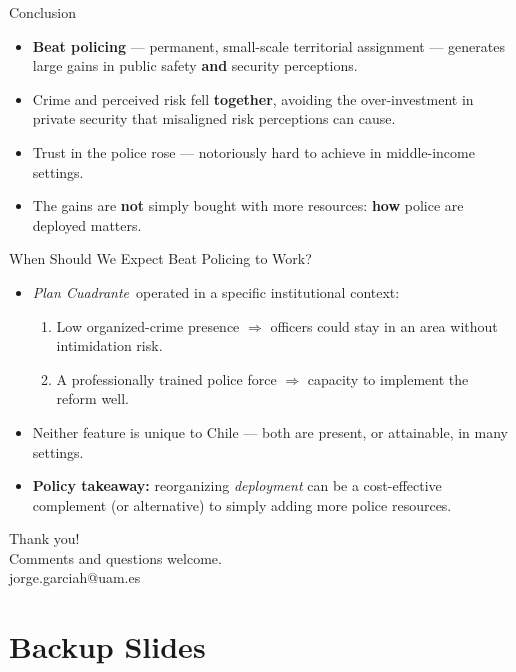 \documentclass[11pt,aspectratio=169]{beamer}
\newcommand{\PC}{\emph{Plan Cuadrante}}
\begin{document}
\begin{frame}{Conclusion}
\begin{itemize}
\item \textbf{Beat policing} --- permanent, small-scale territorial assignment --- generates large gains in public safety \textbf{and} security perceptions.
\item Crime and perceived risk fell \textbf{together}, avoiding the over-investment in private security that misaligned risk perceptions can cause.
\item Trust in the police rose --- notoriously hard to achieve in middle-income settings.
\item The gains are \textbf{not} simply bought with more resources: \textbf{how} police are deployed matters.
\end{itemize}
\end{frame}

\begin{frame}{When Should We Expect Beat Policing to Work?}
\begin{itemize}
\item \PC\ operated in a specific institutional context:
\begin{enumerate}
\item Low organized-crime presence $\Rightarrow$ officers could stay in an area without intimidation risk.
\item A professionally trained police force $\Rightarrow$ capacity to implement the reform well.
\end{enumerate}
\item Neither feature is unique to Chile --- both are present, or attainable, in many settings.
\item \textbf{Policy takeaway:} reorganizing \emph{deployment} can be a cost-effective complement (or alternative) to simply adding more police resources.
\end{itemize}
\end{frame}

\begin{frame}
\centering
{\Large Thank you!}\\[12pt]
\small Comments and questions welcome. \\[6pt]
jorge.garciah@uam.es
\end{frame}

\appendix
\section*{Backup Slides}
\end{document}
